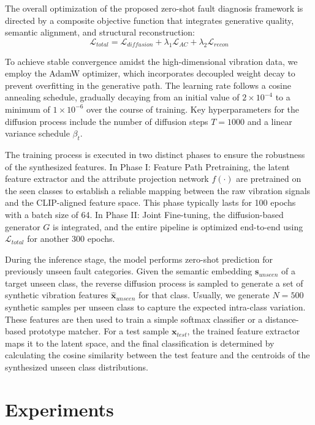 \documentclass[journal]{IEEEtran}
\begin{document}
The overall optimization of the proposed zero-shot fault diagnosis framework is directed by a composite objective function that integrates generative quality, semantic alignment, and structural reconstruction:
\begin{equation}
\mathcal{L}_{total} = \mathcal{L}_{diffusion} + \lambda_1 \mathcal{L}_{AC} + \lambda_2 \mathcal{L}_{recon}
\end{equation}

To achieve stable convergence amidst the high-dimensional vibration data, we employ the AdamW optimizer, which incorporates decoupled weight decay to prevent overfitting in the generative path. The learning rate follows a cosine annealing schedule, gradually decaying from an initial value of $2 \times 10^{-4}$ to a minimum of $1 \times 10^{-6}$ over the course of training. Key hyperparameters for the diffusion process include the number of diffusion steps $T=1000$ and a linear variance schedule $\beta_t$.

The training process is executed in two distinct phases to ensure the robustness of the synthesized features. In Phase I: Feature Path Pretraining, the latent feature extractor and the attribute projection network $f(\cdot)$ are pretrained on the seen classes to establish a reliable mapping between the raw vibration signals and the CLIP-aligned feature space. This phase typically lasts for 100 epochs with a batch size of 64. In Phase II: Joint Fine-tuning, the diffusion-based generator $G$ is integrated, and the entire pipeline is optimized end-to-end using $\mathcal{L}_{total}$ for another 300 epochs.

During the inference stage, the model performs zero-shot prediction for previously unseen fault categories. Given the semantic embedding $\mathbf{s}_{unseen}$ of a target unseen class, the reverse diffusion process is sampled to generate a set of synthetic vibration features $\hat{\mathbf{x}}_{unseen}$ for that class. Usually, we generate $N=500$ synthetic samples per unseen class to capture the expected intra-class variation. These features are then used to train a simple softmax classifier or a distance-based prototype matcher. For a test sample $\mathbf{x}_{test}$, the trained feature extractor maps it to the latent space, and the final classification is determined by calculating the cosine similarity between the test feature and the centroids of the synthesized unseen class distributions.

\section{Experiments}
\label{sec:experiments}
\end{document}
